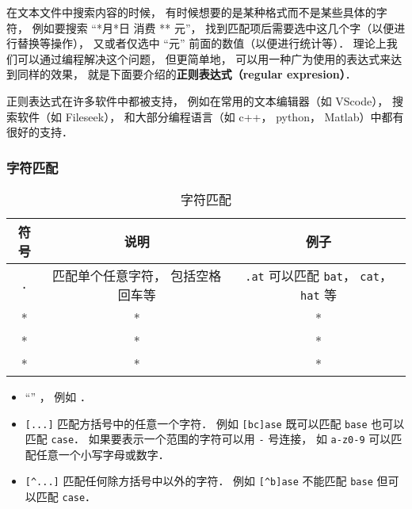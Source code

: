 

在文本文件中搜索内容的时候， 有时候想要的是某种格式而不是某些具体的字符， 例如要搜索 “*月*日 消费 ** 元”， 找到匹配项后需要选中这几个字（以便进行替换等操作）， 又或者仅选中 “元” 前面的数值（以便进行统计等）． 理论上我们可以通过编程解决这个问题， 但更简单地， 可以用一种广为使用的表达式来达到同样的效果， 就是下面要介绍的\textbf{正则表达式（regular expresion）}．

正则表达式在许多软件中都被支持， 例如在常用的文本编辑器（如 VScode）， 搜索软件（如 Fileseek）， 和大部分编程语言（如 c++， python， Matlab）中都有很好的支持．

\subsubsection{字符匹配}
\begin{table}[ht]
\centering
\caption{字符匹配}\label{regex_tab1}
\begin{tabular}{|c|c|c|}
\hline
符号 & 说明 & 例子 \\
\hline
\verb|.| & 匹配单个任意字符， 包括空格回车等 & \verb|.at| 可以匹配 \verb|bat|， \verb|cat|， \verb|hat| 等 \\
\hline
* & * & * \\
\hline
* & * & * \\
\hline
* & * & * \\
\hline
\end{tabular}
\end{table}

\begin{itemize}
\item “” ， 例如 ．
\item \verb|[...]| 匹配方括号中的任意一个字符． 例如 \verb|[bc]ase| 既可以匹配 \verb|base| 也可以匹配 \verb|case|． 如果要表示一个范围的字符可以用 \verb|-| 号连接， 如 \verb|a-z0-9| 可以匹配任意一个小写字母或数字．
\item \verb|[^...]| 匹配任何除方括号中以外的字符． 例如 \verb|[^b]ase| 不能匹配 \verb|base| 但可以匹配 \verb|case|．
\end{itemize}

